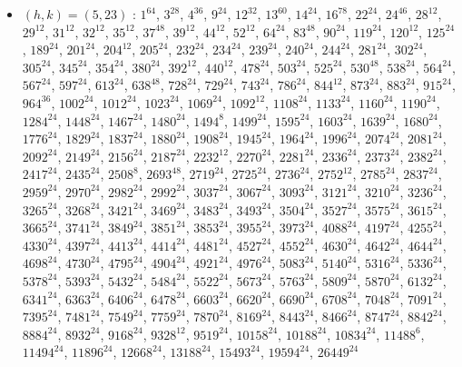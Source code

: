 \begin{itemize}
\item $(h,k)=(5,23)$ : $1^{64}$, $3^{28}$, $4^{36}$, $9^{24}$, $12^{32}$, $13^{60}$, $14^{24}$, $16^{78}$, $22^{24}$, $24^{46}$, $28^{12}$, $29^{12}$, $31^{12}$, $32^{12}$, $35^{12}$, $37^{48}$, $39^{12}$, $44^{12}$, $52^{12}$, $64^{24}$, $83^{48}$, $90^{24}$, $119^{24}$, $120^{12}$, $125^{24}$, $189^{24}$, $201^{24}$, $204^{12}$, $205^{24}$, $232^{24}$, $234^{24}$, $239^{24}$, $240^{24}$, $244^{24}$, $281^{24}$, $302^{24}$, $305^{24}$, $345^{24}$, $354^{24}$, $380^{24}$, $392^{12}$, $440^{12}$, $478^{24}$, $503^{24}$, $525^{24}$, $530^{48}$, $538^{24}$, $564^{24}$, $567^{24}$, $597^{24}$, $613^{24}$, $638^{48}$, $728^{24}$, $729^{24}$, $743^{24}$, $786^{24}$, $844^{12}$, $873^{24}$, $883^{24}$, $915^{24}$, $964^{36}$, $1002^{24}$, $1012^{24}$, $1023^{24}$, $1069^{24}$, $1092^{12}$, $1108^{24}$, $1133^{24}$, $1160^{24}$, $1190^{24}$, $1284^{24}$, $1448^{24}$, $1467^{24}$, $1480^{24}$, $1494^{8}$, $1499^{24}$, $1595^{24}$, $1603^{24}$, $1639^{24}$, $1680^{24}$, $1776^{24}$, $1829^{24}$, $1837^{24}$, $1880^{24}$, $1908^{24}$, $1945^{24}$, $1964^{24}$, $1996^{24}$, $2074^{24}$, $2081^{24}$, $2092^{24}$, $2149^{24}$, $2156^{24}$, $2187^{24}$, $2232^{12}$, $2270^{24}$, $2281^{24}$, $2336^{24}$, $2373^{24}$, $2382^{24}$, $2417^{24}$, $2435^{24}$, $2508^{8}$, $2693^{48}$, $2719^{24}$, $2725^{24}$, $2736^{24}$, $2752^{12}$, $2785^{24}$, $2837^{24}$, $2959^{24}$, $2970^{24}$, $2982^{24}$, $2992^{24}$, $3037^{24}$, $3067^{24}$, $3093^{24}$, $3121^{24}$, $3210^{24}$, $3236^{24}$, $3265^{24}$, $3268^{24}$, $3421^{24}$, $3469^{24}$, $3483^{24}$, $3493^{24}$, $3504^{24}$, $3527^{24}$, $3575^{24}$, $3615^{24}$, $3665^{24}$, $3741^{24}$, $3849^{24}$, $3851^{24}$, $3853^{24}$, $3955^{24}$, $3973^{24}$, $4088^{24}$, $4197^{24}$, $4255^{24}$, $4330^{24}$, $4397^{24}$, $4413^{24}$, $4414^{24}$, $4481^{24}$, $4527^{24}$, $4552^{24}$, $4630^{24}$, $4642^{24}$, $4644^{24}$, $4698^{24}$, $4730^{24}$, $4795^{24}$, $4904^{24}$, $4921^{24}$, $4976^{24}$, $5083^{24}$, $5140^{24}$, $5316^{24}$, $5336^{24}$, $5378^{24}$, $5393^{24}$, $5432^{24}$, $5484^{24}$, $5522^{24}$, $5673^{24}$, $5763^{24}$, $5809^{24}$, $5870^{24}$, $6132^{24}$, $6341^{24}$, $6363^{24}$, $6406^{24}$, $6478^{24}$, $6603^{24}$, $6620^{24}$, $6690^{24}$, $6708^{24}$, $7048^{24}$, $7091^{24}$, $7395^{24}$, $7481^{24}$, $7549^{24}$, $7759^{24}$, $7870^{24}$, $8169^{24}$, $8443^{24}$, $8466^{24}$, $8747^{24}$, $8842^{24}$, $8884^{24}$, $8932^{24}$, $9168^{24}$, $9328^{12}$, $9519^{24}$, $10158^{24}$, $10188^{24}$, $10834^{24}$, $11488^{6}$, $11494^{24}$, $11896^{24}$, $12668^{24}$, $13188^{24}$, $15493^{24}$, $19594^{24}$, $26449^{24}$

\end{itemize}
